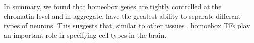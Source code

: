 In summary, we found that homeobox genes are tightly controlled at the chromatin level and in aggregate, have the greatest ability to separate different types of neurons. This suggests that, similar to other tissues \citep{Kratsios_2017,Zheng_2015,Dasen_2009,Philippidou_2013}, homoebox TFs play an important role in specifying cell types in the brain.





